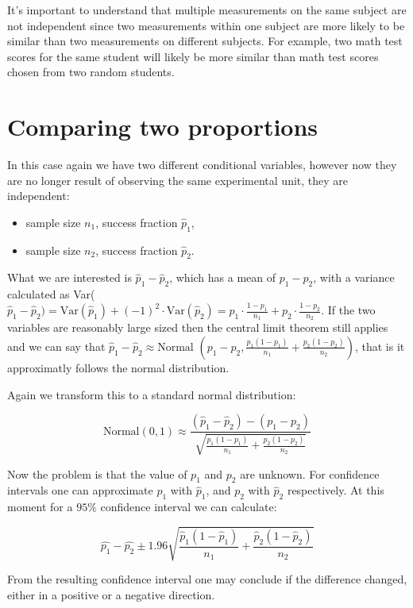 It's important to understand that multiple measurements on the same subject are
not independent since two measurements within one subject are more likely to be
similar than two measurements on different subjects. For example, two math test
scores for the same student will likely be more similar than math test scores
chosen from two random students.

\section{Comparing two proportions}

In this case again we have two different conditional variables, however now they
are no longer result of observing the same experimental unit, they are
independent:

\begin{itemize}
	\item sample size $n_1$, success fraction $\hat{p}_1$,
	\item sample size $n_2$, success fraction $\hat{p}_2$.
\end{itemize}

What we are interested is $\hat{p}_1 -\hat{p}_2$, which has a mean of $p_1-p_2$,
with a variance calculated as Var($\hat{p}_1-\hat{p}_2)=\mbox{Var}(\hat{p}_1) +
	(-1)^2 \cdot
	\mbox{Var}(\hat{p}_2)=p_1\cdot\frac{1-p_1}{n_1}+p_2\cdot\frac{1-p_2}{n_2}$. If
the two variables are reasonably large sized then the central limit theorem
still applies and we can say that $\hat{p}_1 - \hat{p}_2 \approx \mbox{Normal}$
$\left(p_1-p_2, \frac{p_1(1-p_1)}{n_1}+\frac{p_2(1-p_2)}{n_2}\right)$, that is
it approximatly follows the normal distribution.

Again we transform this to a standard normal distribution:

\[ \mbox{Normal}(0,1) \approx \frac{(\hat{p}_1 - \hat{p}_2) - (p_1 -
		p_2)}{\sqrt{\frac{p_1(1-p_1)}{n_1}+\frac{p_2(1-p_2)}{n_2}}}
\]

Now the problem is that the value of $p_1$ and $p_2$ are unknown. For confidence
intervals one can approximate $p_1$ with $\hat{p}_1$, and $p_2$ with $\hat{p}_2$
respectively. At this moment for a $95\%$ confidence interval we can calculate:

\[ \hat{p_1} - \hat{p_2} \pm 1.96
	\sqrt{\frac{\hat{p}_1(1-\hat{p}_1)}{n_1}+\frac{\hat{p}_2(1-\hat{p}_2)}{n_2}} \]

From the resulting confidence interval one may conclude if the difference
changed, either in a positive or a negative direction.

